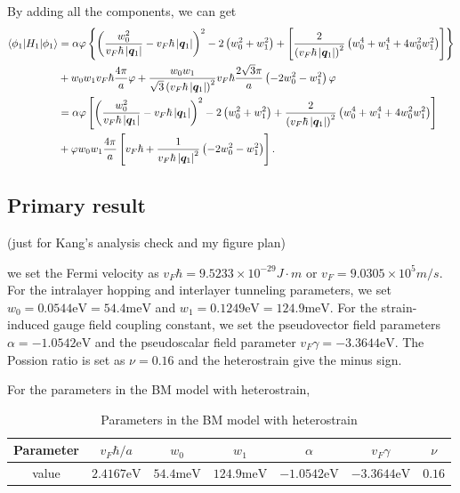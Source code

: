 \documentclass[10pt, oneside]{article}
\newcommand{\vph}{\varphi}
\newcommand{\mr}[1]{\mathrm{#1}}
\newcommand{\p}[1]{\left(#1\right)}
\newcommand{\bb}[1]{\left[#1\right]}
\newcommand{\br}[1]{\left\{#1\right\}}
\newcommand{\bv}[1]{\left|#1\right|}
\begin{document}
By adding all the components, we can get 
\begin{align}
	\begin{split}
		\braket{\phi_{1} | H_{1} | \phi_{1}} &  = \alpha \vph \br{\p{\frac{w_0^2}{v_{F} \hbar \bv{\bm{q}_1}} - v_{F} \hbar \bv{\bm{q}_1}}^2 - 2 \p{w_0^2 + w_1^2} + \bb{\frac{2}{ \p{v_{F} \hbar \bv{\bm{q}_1}}^2} \p{w_0^4 + w_1^4 + 4 w_0^2 w_1^2}}}\\
		&+ w_0 w_1 v_{F} \hbar \frac{4 \pi}{a} \vph + \frac{w_0 w_1}{\sqrt{3} \p{v_{F} \hbar \bv{\bm{q}_{1}}}^2} v_{F} \hbar \frac{ 2 \sqrt{3} \pi}{a} \p{-2 w_0^2 - w_1^2} \vph \\
		& = \alpha \vph \bb{\p{\frac{w_0^2}{v_{F} \hbar \bv{\bm{q}_1}} - v_{F} \hbar \bv{\bm{q}_1}}^2 - 2 \p{w_0^2 + w_1^2} + \frac{2}{ \p{v_{F} \hbar \bv{\bm{q}_1}}^2} \p{w_0^4 + w_1^4 + 4 w_0^2 w_1^2}}\\
		&+ \vph w_0 w_1 \frac{4 \pi}{a}  \bb{v_{F} \hbar + \frac{1}{v_{F} \hbar \bv{\bm{q}_{1}}^2} \p{-2 w_0^2 - w_1^2}}. \\
	\end{split}
\end{align}



\subsection{Primary result}
(just for Kang's analysis check and my figure plan)

we set the Fermi velocity as \(v_{F} \hbar = 9.5233 \times 10^{-29} J \cdot m\) or \(v_{F} = 9.0305 \times 10^{5} m/s\). For the intralayer hopping and interlayer tunneling parameters, we set \(w_0 = 0.0544 \mr{eV} = 54.4 \mr{meV}\) and \(w_1 = 0.1249\mr{eV} = 124.9 \mr{meV}\). For the strain-induced gauge field coupling constant, we set the pseudovector field parameters \(\alpha = -1.0542 \mr{eV}\) and the pseudoscalar field parameter \(v_{F} \gamma = -3.3644 \mr{eV}\). The Possion ratio is set as \(\nu = 0.16\) and the heterostrain give the minus sign.

For the parameters in the BM model with heterostrain, 

\begin{table}[h!]
	\centering
	\begin{tabular}{c c c c c c c}
		\toprule
		Parameter & \(v_{F} \hbar/a\) & \(w_0\) & \(w_1\) & \(\alpha\) & \(v_{F} \gamma\) & \(\nu\) \\
		\midrule
		value & \(2.4167  \mr{eV}\) & \(54.4  \mr{meV}\) &  \(124.9 \mr{meV}\) &  \(-1.0542 \mr{eV}\) &  \( -3.3644 \mr{eV}\) & \(0.16\) \\
		\bottomrule
	\end{tabular}
	\caption*{Parameters in the BM model with heterostrain}
\end{table}
\end{document}
